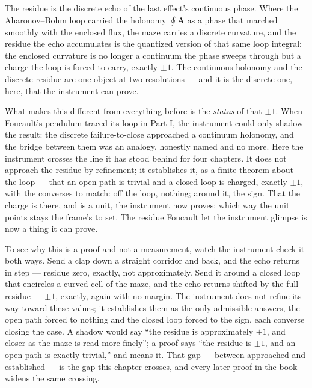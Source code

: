 The residue is the discrete echo of the last effect's continuous phase. Where the Aharonov--Bohm loop carried
the holonomy $\oint \mathbf{A}$ as a phase that marched smoothly with the enclosed flux, the maze carries a
discrete curvature, and the residue the echo accumulates is the quantized version of that same loop integral:
the enclosed curvature is no longer a continuum the phase sweeps through but a charge the loop is forced to
carry, exactly $\pm 1$. The continuous holonomy and the discrete residue are one object at two
resolutions --- and it is the discrete one, here, that the instrument can prove.

What makes this different from everything before is the \emph{status} of that $\pm 1$. When Foucault's
pendulum traced its loop in Part I, the instrument could only shadow the result: the discrete failure-to-close
approached a continuum holonomy, and the bridge between them was an analogy, honestly named and no more. Here
the instrument crosses the line it has stood behind for four chapters. It does not approach the residue by
refinement; it establishes it, as a finite theorem about the loop --- that an open path is trivial and a
closed loop is charged, exactly $\pm 1$, with the converses to match: off the loop, nothing; around it, the
sign. That the charge is there, and is a unit, the instrument now proves; which way the unit points stays the
frame's to set. The residue Foucault let the instrument glimpse is now a thing it can prove.

To see why this is a proof and not a measurement, watch the instrument check it both ways. Send a clap down a
straight corridor and back, and the echo returns in step --- residue zero, exactly, not approximately. Send it
around a closed loop that encircles a curved cell of the maze, and the echo returns shifted by the full
residue --- $\pm 1$, exactly, again with no margin. The instrument does not refine its way toward these
values; it establishes them as the only admissible answers, the open path forced to nothing and the closed
loop forced to the sign, each converse closing the case. A shadow would say ``the residue is approximately
$\pm 1$, and closer as the maze is read more finely''; a proof says ``the residue is $\pm 1$, and an open path
is exactly trivial,'' and means it. That gap --- between approached and established --- is the gap this
chapter crosses, and every later proof in the book widens the same crossing.


